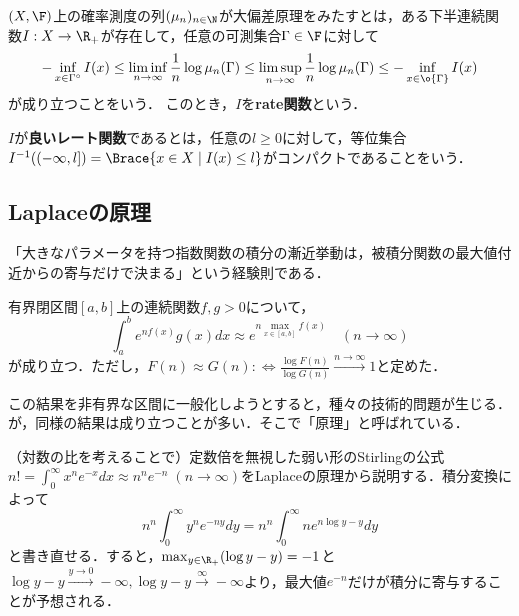 \documentclass[uplatex,dvipdfmx]{jsreport}
\begin{document}
\begin{definition}
    $(X,\F)$上の確率測度の列$(\mu_n)_{n\in\N}$が大偏差原理をみたすとは，ある下半連続関数$I:X\to\R_+$が存在して，任意の可測集合$\Gamma\in\F$に対して
    \[-\inf_{x\in\Gamma^\circ}I(x)\le\liminf_{n\to\infty}\frac{1}{n}\log\mu_n(\Gamma)\le\limsup_{n\to\infty}\frac{1}{n}\log\mu_n(\Gamma)\le-\inf_{x\in\o{\Gamma}}I(x)\]
    が成り立つことをいう．
    このとき，$I$を\textbf{rate関数}という．
\end{definition}

\begin{definition}
    $I$が\textbf{良いレート関数}であるとは，任意の$l\ge0$に対して，等位集合$I^{-1}((-\infty,l])=\Brace{x\in X\mid I(x)\le l}$がコンパクトであることをいう．
\end{definition}

\subsection{Laplaceの原理}

\begin{tcolorbox}[colframe=ForestGreen, colback=ForestGreen!10!white,breakable,colbacktitle=ForestGreen!40!white,coltitle=black,fonttitle=\bfseries\sffamily,
title=]
    「大きなパラメータを持つ指数関数の積分の漸近挙動は，被積分関数の最大値付近からの寄与だけで決まる」という経験則である．
\end{tcolorbox}

\begin{example}
    有界閉区間$[a,b]$上の連続関数$f,g>0$について，
    \[\int^b_ae^{nf(x)}g(x)dx\approx e^{n\max_{x\in[a,b]}f(x)}\quad(n\to\infty)\]
    が成り立つ．ただし，$F(n)\approx G(n):\Leftrightarrow\frac{\log F(n)}{\log G(n)}\xrightarrow{n\to\infty}1$と定めた．
\end{example}
\begin{remark}
    この結果を非有界な区間に一般化しようとすると，種々の技術的問題が生じる．
    が，同様の結果は成り立つことが多い．そこで「原理」と呼ばれている．
\end{remark}

\begin{example}
    （対数の比を考えることで）定数倍を無視した弱い形のStirlingの公式$n!=\int^\infty_0x^ne^{-x}dx\approx n^ne^{-n}\;(n\to\infty)$をLaplaceの原理から説明する．積分変換によって
    \[n^n\int^\infty_0y^ne^{-ny}dy=n^n\int^\infty_0ne^{n\log y-y}dy\]
    と書き直せる．すると，$\max_{y\in\R_+}(\log y-y)=-1$と$\log y-y\xrightarrow{y\to 0}-\infty,\log y-y\xrightarrow{\infty}-\infty$より，最大値$e^{-n}$だけが積分に寄与することが予想される．
\end{example}
\end{document}
